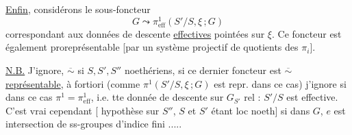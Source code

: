 \uline{Enfin}, considérons le \deleted{\unsure{--}}sous-foncteur
\[
G\leadsto\pi^1_{\mathrm{eff}}(S'/S,\xi\,;G)
\]
correspondant aux données de descente \uline{effectives} pointées sur $\xi$.  Ce foncteur est également  proreprésentable [par un système projectif de quotients des $\pi_i$].

\uline{N.B.} J'ignore, $\overline{\sim}$ si $S,S',S''$ noethériens, si ce dernier foncteur est $\overline{\sim}$ \uline{représentable}, à fortiori (comme $\pi^1(S'/S,\xi\,;G)$ est repr. dans ce cas) j'ignore si dans ce cas $\pi^1=\pi^1_{\mathrm{eff}}$, i.e. tte donnée de descente sur $G_{S'}$ rel : $S'/S$ est effective.
\margin{Pb \unsure{résolu|résolue|intér.} \unsure{par|pour} l'affirmative [sous seule réserve \uline{$S$ \inserted{loc} noeth} \deleted{\unsure{]}} et $S'\to S$ fid plat quasi-compact]}
C'est vrai cependant [ hypothèse sur $S''$, $S$ et $S'$ étant loc noeth] si  dans $G$, $e$ est intersection de ss-groupes d'indice fini .....


